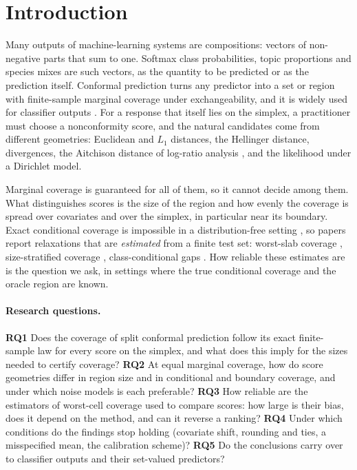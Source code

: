 \section{Introduction}
\label{sec:intro}
Many outputs of machine-learning systems are compositions: vectors of non-negative parts that sum to one.
Softmax class probabilities, topic proportions and species mixes are such vectors, as the quantity to be predicted or as the prediction itself.
Conformal prediction \citep{vovk2005algorithmic,angelopoulos2023gentle} turns any predictor into a set or region with finite-sample marginal coverage under exchangeability, and it is widely used for classifier outputs \citep{romano2020classification,angelopoulos2021uncertainty}.
For a response that itself lies on the simplex, a practitioner must choose a nonconformity score, and the natural candidates come from different geometries: Euclidean and $L_1$ distances, the Hellinger distance, divergences, the Aitchison distance of log-ratio analysis \citep{aitchison1982statistical}, and the likelihood under a Dirichlet model.

Marginal coverage is guaranteed for all of them, so it cannot decide among them.
What distinguishes scores is the size of the region and how evenly the coverage is spread over covariates and over the simplex, in particular near its boundary.
Exact conditional coverage is impossible in a distribution-free setting \citep{vovk2012conditional,barber2021limits}, so papers report relaxations that are \emph{estimated} from a finite test set: worst-slab coverage \citep{cauchois2020knowing}, size-stratified coverage \citep{angelopoulos2021uncertainty}, class-conditional gaps \citep{ding2023class}.
How reliable these estimates are is the question we ask, in settings where the true conditional coverage and the oracle region are known.

\paragraph{Research questions.}
\textbf{RQ1} Does the coverage of split conformal prediction follow its exact finite-sample law for every score on the simplex, and what does this imply for the sizes needed to certify coverage?
\textbf{RQ2} At equal marginal coverage, how do score geometries differ in region size and in conditional and boundary coverage, and under which noise models is each preferable?
\textbf{RQ3} How reliable are the estimators of worst-cell coverage used to compare scores: how large is their bias, does it depend on the method, and can it reverse a ranking?
\textbf{RQ4} Under which conditions do the findings stop holding (covariate shift, rounding and ties, a misspecified mean, the calibration scheme)?
\textbf{RQ5} Do the conclusions carry over to classifier outputs and their set-valued predictors?

